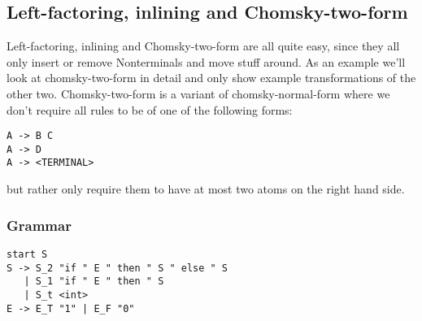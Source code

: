 \documentclass[a4paper]{article}
\begin{document}
\subsection*{Left-factoring, inlining and Chomsky-two-form}
Left-factoring, inlining and Chomsky-two-form are all quite easy, since they all only insert or remove Nonterminals and move stuff around. As an example we'll look at chomsky-two-form in detail and only show example transformations of the other two. Chomsky-two-form is a variant of chomsky-normal-form where we don't require all rules to be of one of the following forms:
\begin{verbatim}
A -> B C
A -> D
A -> <TERMINAL>
\end{verbatim}
but rather only require them to have at most two atoms on the right hand side.
\subsubsection*{Grammar}
\begin{lstlisting}[language=grammar]
start S
S -> S_2 "if " E " then " S " else " S 
   | S_1 "if " E " then " S 
   | S_t <int>
E -> E_T "1" | E_F "0"
\end{lstlisting}
\end{document}
